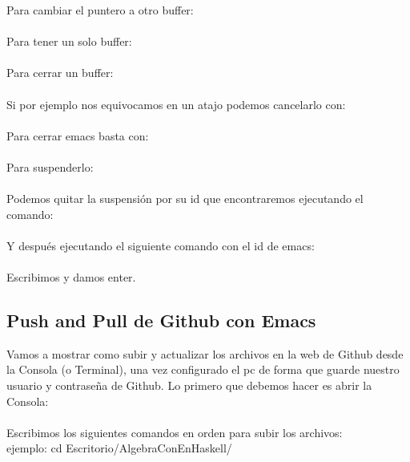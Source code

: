 Para cambiar el puntero a otro buffer:\\
\\

Para tener un solo buffer:\\
\\

Para cerrar un buffer:\\
\\

Si por ejemplo nos equivocamos en un atajo podemos cancelarlo con:\\
\\

Para cerrar emacs basta con:\\
\\

Para suspenderlo:\\
\\

Podemos quitar la suspensión por su id que encontraremos ejecutando el comando:\\

\\

Y después ejecutando el siguiente comando con el id de emacs:\\

\\

Escribimos  y damos enter. \\


\subsection{Push and Pull de Github con Emacs}

Vamos a mostrar como subir y actualizar los archivos en la web de Github desde la Consola (o Terminal), una vez configurado el pc de forma que guarde nuestro usuario y contraseña de Github. Lo primero que debemos hacer es abrir la Consola:\\

\\

Escribimos los siguientes comandos en orden para subir los archivos:\\

 ejemplo: cd Escritorio/AlgebraConEnHaskell/ \\


